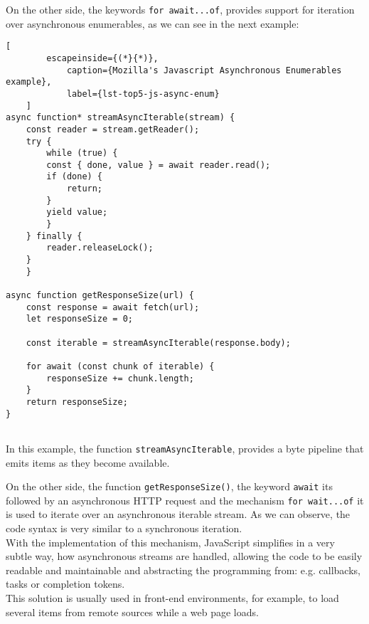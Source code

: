 	On the other side, the keywords \texttt{for await...of}, provides support for iteration over asynchronous enumerables, as we can see in the next example:


\begin{center}
	\lstset{basicstyle=\scriptsize\ttfamily,frame=bottomline}
	\centering
	\begin{minipage}[t][][b]{.46\textwidth}
	\begin{lstlisting}[
		escapeinside={(*}{*)},
			caption={Mozilla's Javascript Asynchronous Enumerables example},
			label={lst-top5-js-async-enum}
	]
async function* streamAsyncIterable(stream) {
	const reader = stream.getReader();
	try {
		while (true) {
		const { done, value } = await reader.read();
		if (done) {
			return;
		}
		yield value;
		}
	} finally {
		reader.releaseLock();
	}
	}

async function getResponseSize(url) {
	const response = await fetch(url);
	let responseSize = 0;
	
	const iterable = streamAsyncIterable(response.body);
	
	for await (const chunk of iterable) {
		responseSize += chunk.length;
	}
	return responseSize;
}  
		
	\end{lstlisting}
	\end{minipage}
\end{center}



In this example, the function \texttt{streamAsyncIterable}, provides a byte pipeline that emits items as they become available.

On the other side, the function \texttt{getResponseSize()}, the keyword \texttt{await} its followed by an asynchronous HTTP request and the mechanism \texttt{for wait...of} it is used to iterate over an asynchronous iterable stream. As we can observe, the code syntax is very similar to a synchronous iteration. \\

With the implementation of this mechanism, JavaScript simplifies in a very subtle way, how asynchronous streams are handled, allowing the code to be easily readable and maintainable and abstracting the programming from: e.g. callbacks, tasks or completion tokens.\\

This solution is usually used in front-end environments, for example, to load several items from remote sources while a web page loads.
\clearpage


